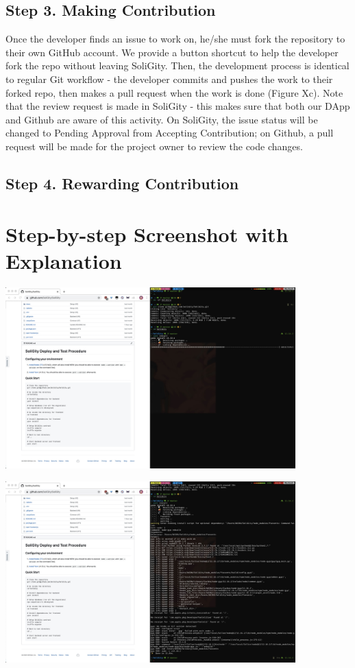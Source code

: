 \documentclass[12pt]{article}
\renewcommand{\_}{\kern-1.5pt\textunderscore\kern-1.5pt}
\begin{document}
\subsection*{Step 3. Making Contribution}

Once the developer finds an issue to work on, he/she must fork the repository to their own GitHub account. We provide
a button shortcut to help the developer fork the repo without leaving SoliGity. Then, the development process is
identical to regular Git workflow - the developer commits and pushes the work to their forked repo, then makes a pull
request when the work is done (Figure Xc). Note that the review request is made in SoliGity - this makes sure that
both our DApp and Github are aware of this activity. On SoliGity, the issue status will be changed to Pending Approval
from Accepting Contribution; on Github, a pull request will be made for the project owner to review the code changes.

\subsection*{Step 4. Rewarding Contribution}



\section{Step-by-step Screenshot with Explanation}

\includegraphics[height=7cm]{graphs/01. git_clone}

\includegraphics[height=7cm]{graphs/02. yarn_install_backend}
\end{document}
